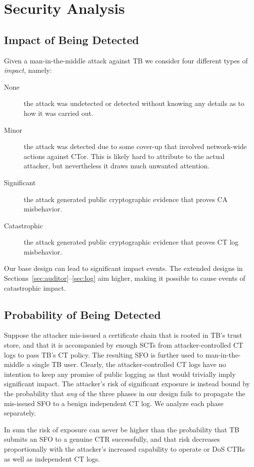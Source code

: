 \section{Security Analysis} \label{sec:analysis}

\subsection{Impact of Being Detected} \label{sec:analysis:impact}
Given a man-in-the-middle attack against TB we consider four
different types of \emph{impact}, namely:
\begin{description}
	\item[None] the attack was undetected or detected without knowing any
		details as to how it was carried out.
	\item[Minor] the attack was detected due to some cover-up that involved
		network-wide actions against CTor.  This is likely hard to attribute to
		the actual attacker, but nevertheless it draws much unwanted attention.
	\item[Significant] the attack generated public cryptographic evidence
		that proves CA misbehavior.
	\item[Catastrophic] the attack generated public cryptographic evidence
		that proves CT log misbehavior.
\end{description}

Our base design can lead to significant impact events.  The extended designs in
Sections~\ref{sec:auditor}--\ref{sec:log} aim higher, making it possible to
cause events of catastrophic impact.

\subsection{Probability of Being Detected} \label{sec:analysis:pr}
Suppose the attacker mis-issued a certificate chain that is rooted in TB's
trust store, and that it is accompanied by enough SCTs from
attacker-controlled CT logs to pass TB's CT policy.  The resulting SFO
is further used to man-in-the-middle a single TB user.  Clearly, the
attacker-controlled CT logs have no intention to keep any promise of public
logging as that would trivially imply significant impact.  The attacker's risk
of significant exposure is instead bound by the probability that \emph{any} of
the three phases in our design fails to propagate the mis-issued SFO to a benign
independent CT log.  We analyze each phase separately.

In sum the risk of exposure can never be higher than the probability that TB
submits an SFO to a genuine CTR successfully, and that risk decreases
proportionally with the attacker's increased capability to operate or DoS CTRs
as well as independent CT logs.

